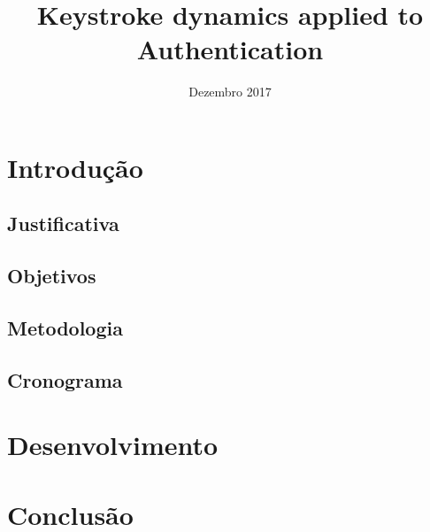 \documentclass[pfc]{imetex}
\title{Keystroke dynamics applied to Authentication}
\date{Dezembro 2017}
\begin{document}
\chapter{Introdução}

\section{Justificativa}
\section{Objetivos}
\section{Metodologia}
\section{Cronograma}
\chapter{Desenvolvimento}
\chapter{Conclusão}
\end{document}
